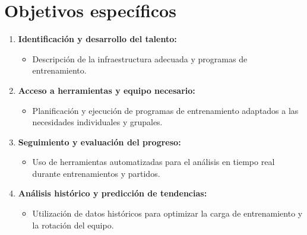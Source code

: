 \section{Objetivos específicos}
\begin{enumerate}
    \item \textbf{Identificación y desarrollo del talento:}
    \begin{itemize}
        \item Descripción de la infraestructura adecuada y programas de entrenamiento.
    \end{itemize}

    \item \textbf{Acceso a herramientas y equipo necesario:}
    \begin{itemize}
        \item Planificación y ejecución de programas de entrenamiento adaptados a las necesidades individuales y grupales.
    \end{itemize}

    \item \textbf{Seguimiento y evaluación del progreso:}
    \begin{itemize}
        \item Uso de herramientas automatizadas para el análisis en tiempo real durante entrenamientos y partidos.
    \end{itemize}

    \item \textbf{Análisis histórico y predicción de tendencias:}
    \begin{itemize}
        \item Utilización de datos históricos para optimizar la carga de entrenamiento y la rotación del equipo.
    \end{itemize}
\end{enumerate}
